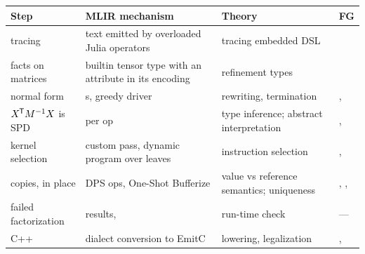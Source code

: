 \begin{center}\small
\begin{tabularx}{\linewidth}{@{}P{3.1cm}P{4.6cm}P{3.3cm}L@{}}
\toprule
\textbf{Step} & \textbf{MLIR mechanism} & \textbf{Theory} & \textbf{FG} \\
\midrule
tracing & text emitted by overloaded Julia operators & tracing embedded DSL &  \\
facts on matrices & builtin tensor type with an attribute in its encoding & refinement types &  \\
normal form & s, greedy driver & rewriting, termination & ,  \\
\(X^{\mkern-1.5mu\mathsf{T}} M^{-1} X\) is SPD &  per op & type inference; abstract interpretation & ,  \\
kernel selection & custom pass, dynamic program over leaves & instruction selection & ,  \\
copies, in place & DPS ops, One-Shot Bufferize & value vs reference semantics; uniqueness & , ,  \\
failed factorization &  results,  & run-time check & --- \\
C++ & dialect conversion to EmitC & lowering, legalization & ,  \\
\bottomrule
\end{tabularx}
\end{center}
